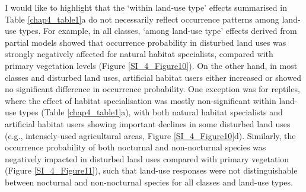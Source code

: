 I would like to highlight that the `within land-use type' effects summarised in Table \ref{chap4_table1}a do not necessarily reflect occurrence patterns among land-use types. For example, in all classes, `among land-use type' effects derived from partial models showed that occurrence probability in disturbed land uses was strongly negatively affected for natural habitat specialists, compared with primary vegetation levels (Figure \ref{SI_4_Figure10}). On the other hand, in most classes and disturbed land uses, artificial habitat users either increased or showed no significant difference in occurrence probability. One exception was for reptiles, where the effect of habitat specialisation was mostly non-significant within land-use types (Table \ref{chap4_table1}a), with both natural habitat specialists and artificial habitat users showing important declines in some disturbed land uses (e.g., intensely-used agricultural areas, Figure \ref{SI_4_Figure10}d). Similarly, the occurrence probability of both nocturnal and non-nocturnal species was negatively impacted in disturbed land uses compared with primary vegetation (Figure \ref{SI_4_Figure11}), such that land-use responses were not distinguishable between nocturnal and non-nocturnal species for all classes and land-use types. 


